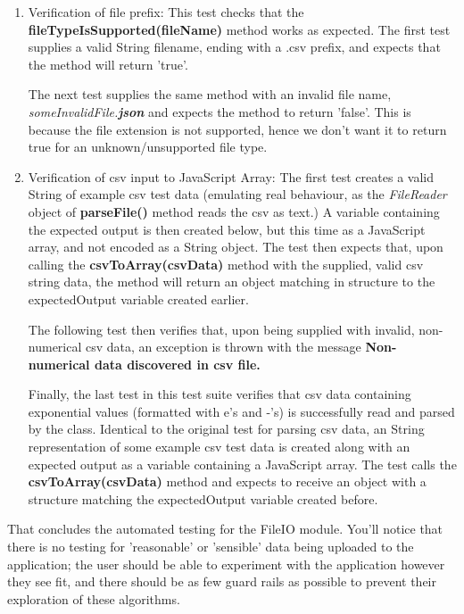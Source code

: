 \begin{enumerate}
    \item Verification of file prefix: This test checks that the {\bf fileTypeIsSupported(fileName)} method works as expected. The first test supplies a valid String filename, ending with a .csv prefix, and expects that the method will return 'true'.
    
    The next test supplies the same method with an invalid file name, {\it someInvalidFile.{\bf json}} and expects the method to return 'false'. This is because the file extension is not supported, hence we don't want it to return true for an unknown/unsupported file type.
    \item Verification of csv input to JavaScript Array: The first test creates a valid String of example csv test data (emulating real behaviour, as the {\it FileReader} object of {\bf parseFile()} method reads the csv as text.) A variable containing the expected output is then created below, but this time as a JavaScript array, and not encoded as a String object. The test then expects that, upon calling the {\bf csvToArray(csvData)} method with the supplied, valid csv string data, the method will return an object matching in structure to the expectedOutput variable created earlier.
    
    The following test then verifies that, upon being supplied with invalid, non-numerical csv data, an exception is thrown with the message {\bf Non-numerical data discovered in csv file.}
    
    Finally, the last test in this test suite verifies that csv data containing exponential values (formatted with e's and -'s) is successfully read and parsed by the class. Identical to the original test for parsing csv data, an String representation of some example csv test data is created along with an expected output as a variable containing a JavaScript array. The test calls the {\bf csvToArray(csvData)} method and expects to receive an object with a structure matching the expectedOutput variable created before.
\end{enumerate}

That concludes the automated testing for the FileIO module. You'll notice that there is no testing for 'reasonable' or 'sensible' data being uploaded to the application; the user should be able to experiment with the application however they see fit, and there should be as few guard rails as possible to prevent their exploration of these algorithms. 

